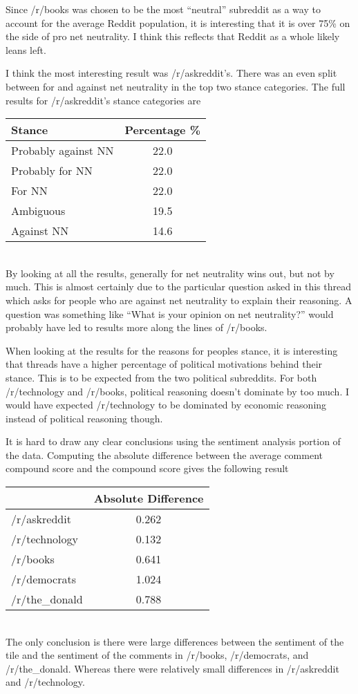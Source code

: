 \documentclass[11pt]{article}
\begin{document}
	Since /r/books was chosen to be the most ``neutral'' subreddit as a way to account for the average Reddit population, it is interesting that it is over 75\% on the side of pro net neutrality. I think this reflects that Reddit as a whole likely leans left. 
	
	I think the most interesting result was /r/askreddit's. There was an even split between for and against net neutrality in the top two stance categories. The full results for /r/askreddit's stance categories are 
	\\[2\baselineskip]
	\begin{tabular}{l|c}
		Stance & Percentage \% \\\hline
		Probably against NN & 22.0 \\
		Probably for NN & 22.0\\
		For NN & 22.0 \\
		Ambiguous & 19.5\\
		Against NN & 14.6
	\end{tabular}
	\\[2\baselineskip]
	By looking at all the results, generally for net neutrality wins out, but not by much. This is almost certainly due to the particular question asked in this thread which asks for people who are against net neutrality to explain their reasoning. A question was something like ``What is your opinion on net neutrality?'' would probably have led to results more along the lines of /r/books. 
	
	When looking at the results for the reasons for peoples stance, it is interesting that threads have a higher percentage of political motivations behind their stance. This is to be expected from the two political subreddits. For both /r/technology and /r/books, political reasoning doesn't dominate by too much. I would have expected /r/technology to be dominated by economic reasoning instead of political reasoning though.  
	
	It is hard to draw any clear conclusions using the sentiment analysis portion of the data. Computing the absolute difference between the average comment compound score and the compound score gives the following result
	\\[2\baselineskip]
	\begin{tabular}{l|c}
		& Absolute Difference \\\hline
		/r/askreddit & 0.262 \\
		/r/technology & 0.132 \\
		/r/books & 0.641  \\
		/r/democrats & 1.024 \\
		/r/the\_donald & 0.788
	\end{tabular}
	\\[2\baselineskip]
	The only conclusion is there were large differences between the sentiment of the tile and the sentiment of the comments in /r/books, /r/democrats, and /r/the\_donald. Whereas there were relatively small differences in /r/askreddit and /r/technology.
\end{document}
